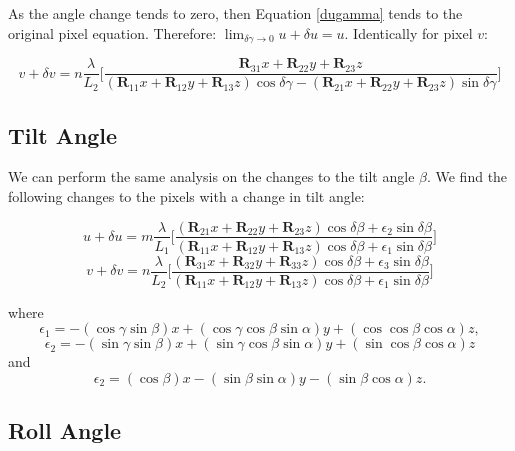 \documentclass[12pt]{article}
\newcommand{\mtx}[1]{\ensuremath{\mathbf{#1}}}
\begin{document}
As the angle change tends to zero, then Equation \ref{dugamma} tends to the original pixel equation. Therefore: $\lim_{\delta\gamma \to 0} u + \delta u = u$. Identically for pixel $v$:

\begin{equation}\label{dvgamma}
    v + \delta v = n\frac{\lambda}{L_2}
        \bigg[\frac{\mtx{R}_{31}x + \mtx{R}_{22}y + \mtx{R}_{23}z}
                   {(\mtx{R}_{11}x + \mtx{R}_{12}y + \mtx{R}_{13}z)\cos\delta\gamma -(\mtx{R}_{21}x + \mtx{R}_{22}y + \mtx{R}_{23}z)\sin\delta\gamma}                  
        \bigg]
\end{equation}

\subsection{Tilt Angle}

We can perform the same analysis on the changes to the tilt angle $\beta$. We find the following changes to the pixels with a change in tilt angle:

\begin{equation}\label{dubeta}
    u + \delta u = m\frac{\lambda}{L_1}
        \bigg[\frac{(\mtx{R}_{21}x + \mtx{R}_{22}y + \mtx{R}_{23}z)\cos\delta\beta 
                  + \epsilon_2\sin\delta\beta}
                   {(\mtx{R}_{11}x + \mtx{R}_{12}y + \mtx{R}_{13}z)\cos\delta\beta
                  + \epsilon_1\sin\delta\beta}                  
        \bigg]
\end{equation}
\begin{equation}\label{dvbeta}
    v + \delta v = n\frac{\lambda}{L_2}
        \bigg[\frac{(\mtx{R}_{31}x + \mtx{R}_{32}y + \mtx{R}_{33}z)\cos\delta\beta 
                  + \epsilon_3\sin\delta\beta}
                   {(\mtx{R}_{11}x + \mtx{R}_{12}y + \mtx{R}_{13}z)\cos\delta\beta
                  + \epsilon_1\sin\delta\beta}                  
        \bigg]
\end{equation}

where
$$
\epsilon_1 = -(\cos\gamma\sin\beta)x + (\cos\gamma\cos\beta\sin\alpha) y + (\cos\cos\beta\cos\alpha) z,
$$
$$
\epsilon_2 = -(\sin\gamma\sin\beta)x + (\sin\gamma\cos\beta\sin\alpha) y + (\sin\cos\beta\cos\alpha) z
$$
and
$$
\epsilon_2 = (\cos\beta)x - (\sin\beta\sin\alpha) y - (\sin\beta\cos\alpha) z.
$$

\subsection{Roll Angle}
\end{document}
